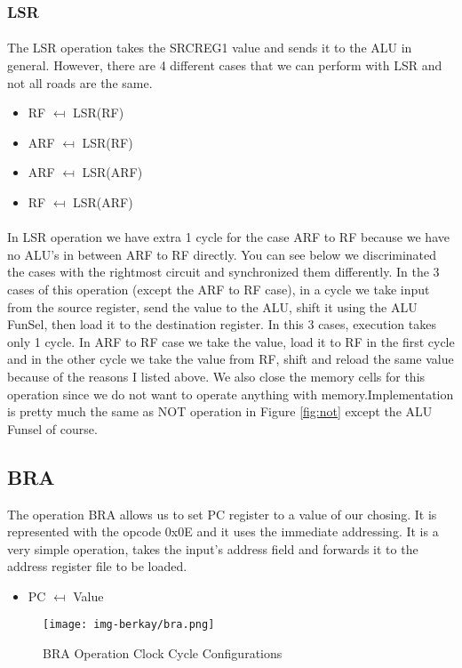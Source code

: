 \documentclass{article}
\begin{document}
\subsubsection{LSR}
\paragraph{}
The LSR operation takes the SRCREG1 value and sends it to the ALU in general. However, there are 4 different cases that we can perform with LSR and not all  roads are the same.
\begin{itemize}
    \item RF $\mapsfrom$ LSR(RF)
    \item ARF $\mapsfrom$ LSR(RF)
    \item ARF $\mapsfrom$ LSR(ARF)
    \item RF $\mapsfrom$ LSR(ARF)
\end{itemize}

\paragraph{}
In LSR operation we have extra 1 cycle for the case ARF to RF because we have no ALU's in between ARF to RF directly. You can see below we discriminated the cases with the rightmost circuit and synchronized them differently. In the 3 cases of this operation (except the ARF to RF case), in a cycle we take input from the source register, send the value to the ALU, shift it using the ALU FunSel, then load it to the destination register. In this 3 cases, execution takes only 1 cycle. In ARF to RF case we take the value, load it to RF in the first cycle and in the other cycle we take the value from RF, shift and reload the same value because of the reasons I listed above. We also close the memory cells for this operation since we do not want to operate anything with memory.Implementation is pretty much the same as NOT operation in Figure \ref{fig:not} except the ALU Funsel of course.
\newpage
\subsection{BRA}
The operation BRA allows us to set PC register to a value of our chosing. It is represented with the opcode 0x0E and it uses the immediate addressing. It is a very simple operation, takes the input's address field and forwards it to the address register file to be loaded.
\begin{itemize}
    \item PC $\mapsfrom$ Value
\end{itemize}
\begin{figure}[h]
    \centering
    \texttt{[image: img-berkay/bra.png]}
    \caption{BRA Operation Clock Cycle Configurations}
    \label{fig:my_label}
\end{figure}
\newpage
\end{document}
